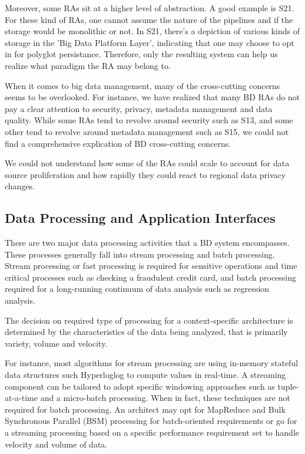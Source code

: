 \documentclass[review]{elsarticle}
\begin{document}
Moreover, some RAs sit at a higher level of abstraction. A good example is S21. For these kind of RAs, one cannot assume the nature of the pipelines and if the storage would be monolithic or not. In S21, there's a depiction of various kinds of storage in the 'Big Data Platform Layer', indicating that one may choose to opt in for polyglot persistance. Therefore, only the resulting system can help us realize what paradigm the RA may belong to. 

When it comes to big data management, many of the cross-cutting concerns seems to be overlooked. For instance, we have realized that many BD RAs do not pay a clear attention to security, privacy, metadata management and data quality. While some RAs tend to revolve around security such as S13, and some other tend to revolve around metadata management such as S15, we could not find a comprehensive explication of BD cross-cutting concerns.

We could not understand how some of the RAs could scale to account for data source proliferation and how rapidly they could react to regional data privacy changes. 

\subsection{Data Processing and Application Interfaces}

There are two major data processing activities that a BD system encompasses. These processes generally fall into stream processing and batch processing. Stream processing or fast processing is required for sensitive operations and time critical processes such as checking a fraudulent credit card, and batch processing required for a long-running continuum of data analysis such as regression analysis. 

The decision on required type of processing for a context-specific architecture is determined by the characteristics of the data being analyzed, that is primarily variety, volume and velocity. 

For instance, most algorithms for stream processing are using in-memory stateful data structures such Hyperloglog to compute values in real-time. A streaming component can be tailored to adopt specific windowing approaches such as tuple-at-a-time and a micro-batch processing. When in fact, these techniques are not required for batch processing. An architect may opt for MapReduce and Bulk Synchronous Parallel (BSM) processing for batch-oriented requirements or go for a streaming processing based on a specific performance requirement set to handle velocity and volume of data. 
\end{document}
